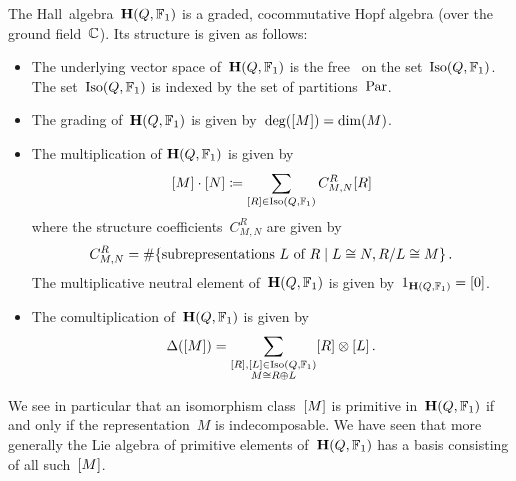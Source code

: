 \documentclass[a4paper,11pt]{scrartcl}
\begin{document}
\begin{recall}
  The Hall~algebra~$\mathbf{H}(Q, \mathbb{F}_1)$ is a graded, cocommutative Hopf algebra (over the ground field~$\Complex$).
  Its structure is given as follows:
  \begin{itemize}
    \item
      The underlying vector space of~$\mathbf{H}(Q, \mathbb{F}_1)$ is the free~\vectorspace{$\Complex$} on the set~$\operatorname{Iso}(Q, \mathbb{F}_1)$.
      The set~$\operatorname{Iso}(Q, \mathbb{F}_1)$ is indexed by the set of partitions~$\mathrm{Par}$.
    \item
      The grading of~$\mathbf{H}(Q, \mathbb{F}_1)$ is given by~$\deg( [M] ) = \dim(M)$.
    \item
      The multiplication of$~\mathbf{H}(Q, \mathbb{F}_1)$ is given by
      \[
        [M] \cdot [N]
        \coloneqq
        \sum_{[R] \in \operatorname{Iso}(Q, \mathbb{F}_1)}
        C^R_{M,N} [R]
      \]
      where the structure coefficients~$C^R_{M,N}$ are given by
      \[
        C^R_{M,N}
        =
        \counting
        \{
          \text{subrepresentations~$L$ of~$R$}
        \suchthat
          L \cong N, R/L \cong M
        \} \,.
      \]
      The multiplicative neutral element of~$\mathbf{H}(Q, \mathbb{F}_1)$ is given by~$1_{\mathbf{H}(Q, \mathbb{F}_1)} = [0]$.
    \item
      The comultiplication of~$\mathbf{H}(Q, \mathbb{F}_1)$ is given by
      \[
        \Delta( [M] )
        =
        \sum_{
          \substack{
            [R], [L] \in \operatorname{Iso}(Q, \mathbb{F}_1) \\
            M \cong R \oplus L
          }
        }
        [R] \otimes [L] \,.
      \]
  \end{itemize}
  We see in particular that an isomorphism class~$[M]$ is primitive in~$\mathbf{H}(Q, \mathbb{F}_1)$ if and only if the representation~$M$ is indecomposable.
  We have seen that more generally the Lie algebra of primitive elements of~$\mathbf{H}(Q, \mathbb{F}_1)$ has a basis consisting of all such~$[M]$.
\end{recall}
\end{document}
